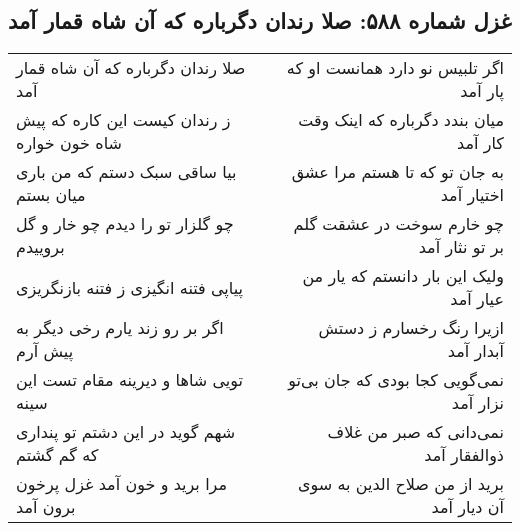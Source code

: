 \begin{center}
\section*{غزل شماره ۵۸۸: صلا رندان دگرباره که آن شاه قمار آمد}
\label{sec:0588}
\begin{longtable}{l p{0.5cm} r}
صلا رندان دگرباره که آن شاه قمار آمد
&&
اگر تلبیس نو دارد همانست او که پار آمد
\\
ز رندان کیست این کاره که پیش شاه خون خواره
&&
میان بندد دگرباره که اینک وقت کار آمد
\\
بیا ساقی سبک دستم که من باری میان بستم
&&
به جان تو که تا هستم مرا عشق اختیار آمد
\\
چو گلزار تو را دیدم چو خار و گل بروییدم
&&
چو خارم سوخت در عشقت گلم بر تو نثار آمد
\\
پیاپی فتنه انگیزی ز فتنه بازنگریزی
&&
ولیک این بار دانستم که یار من عیار آمد
\\
اگر بر رو زند یارم رخی دیگر به پیش آرم
&&
ازیرا رنگ رخسارم ز دستش آبدار آمد
\\
تویی شاها و دیرینه مقام تست این سینه
&&
نمی‌گویی کجا بودی که جان بی‌تو نزار آمد
\\
شهم گوید در این دشتم تو پنداری که گم گشتم
&&
نمی‌دانی که صبر من غلاف ذوالفقار آمد
\\
مرا برید و خون آمد غزل پرخون برون آمد
&&
برید از من صلاح الدین به سوی آن دیار آمد
\\
\end{longtable}
\end{center}
